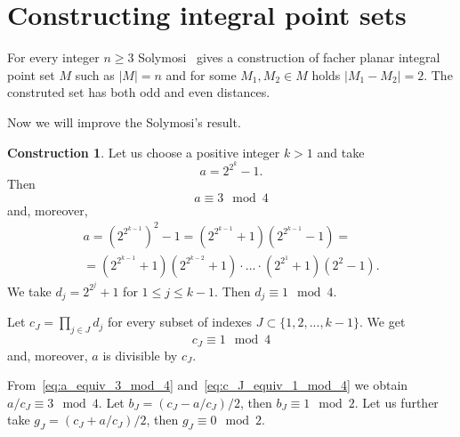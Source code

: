 \documentclass[a4paper,14pt]{article} %
\theoremstyle{plain}
\theoremstyle{definition}
\newtheorem{construction}[theorem]{Construction}
\begin{document}
\section{Constructing integral point sets}
For every integer $n\geq 3$ Solymosi~\cite{solymosi2003note} gives a construction of facher planar integral point set $M$
such as $|M| = n$ and for some $M_1, M_2 \in M$ holds $|M_1 - M_2| = 2$.
The construted set has both odd and even distances.

Now we will improve the Solymosi's result.

\begin{construction}
	\label{con:planar_set_with_minimeter_1}
	Let us choose a positive integer $k > 1$ and take
	\begin{equation}
		a = 2^{2^k} - 1
		.
	\end{equation}
	Then
	\begin{equation}
		\label{eq:a_equiv_3_mod_4}
		a \equiv 3 \mod 4
	\end{equation}
	and, moreover,
	\begin{multline}
		a = \left(2^{2^{k-1}}\right)^2 - 1
		=
		\left(2^{2^{k-1}} + 1\right) \left(2^{2^{k-1}} - 1\right)
		=
		\\=
		\left(2^{2^{k-1}} + 1\right) \left(2^{2^{k-2}} + 1\right) \cdot ... \cdot \left(2^{2^1} + 1\right) \left(2^2 - 1\right)
		.
	\end{multline}
	We take $d_j = 2^{2^j} + 1$ for $1 \leq j \leq k-1$.
	Then $d_j \equiv 1 \mod 4$.

	Let $c_J = \prod_{j\in J} d_j$ for every subset of indexes $J\subset\{1,2,...,k-1\}$.
	We get
	\begin{equation}
		\label{eq:c_J_equiv_1_mod_4}
		c_J\equiv 1 \mod{4}
	\end{equation}
	and, moreover, $a$ is divisible by $c_J$.


	From~\eqref{eq:a_equiv_3_mod_4} and~\eqref{eq:c_J_equiv_1_mod_4} we obtain $a/c_J \equiv 3 \mod 4$.
	Let $b_J = (c_J - a/c_J)/2$, then $b_J \equiv 1 \mod 2$.
	Let us further take $g_J = (c_J + a/c_J)/2$, then $g_J \equiv 0 \mod 2$.


\end{construction}
\end{document}
